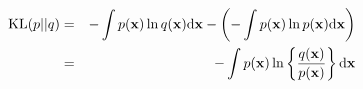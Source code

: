 \begin{eqnarray*}
{\rm KL}(p || q) &=& - \int p({\bf x})\ln q({\bf x}) {\rm d}{\bf x} - \left( - \int p({\bf x})\ln p({\bf x}){\rm d}{\bf x} \right) \\
&=& -\int p({\bf x})\ln \left\{ \frac{q({\bf x})}{p({\bf x})} \right\} {\rm d}{\bf x}
\end{eqnarray*}
